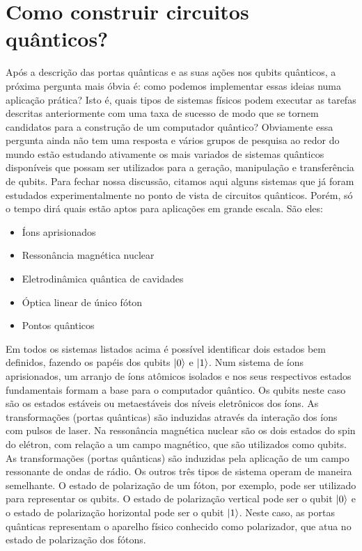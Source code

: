 \documentclass{article}
\begin{document}
\section{Como construir circuitos quânticos?}

Após a descrição das portas quânticas e as suas ações nos qubits quânticos, a próxima pergunta mais óbvia é: como podemos implementar essas ideias numa aplicação prática? Isto é, quais tipos de sistemas físicos podem executar as tarefas descritas anteriormente com uma taxa de sucesso de modo que se tornem candidatos para a construção de um computador quântico? Obviamente essa pergunta ainda não tem uma resposta e vários grupos de pesquisa ao redor do mundo estão estudando ativamente os mais variados de sistemas quânticos disponíveis que possam ser utilizados para a geração, manipulação e transferência de qubits. Para fechar nossa discussão, citamos aqui alguns sistemas que já foram estudados experimentalmente no ponto de vista de circuitos quânticos. Porém, só o tempo dirá quais estão aptos para aplicações em grande escala. São eles:

\begin{itemize}
    \item Íons aprisionados
    \item Ressonância magnética nuclear
    \item Eletrodinâmica quântica de cavidades
    \item Óptica linear de único fóton
    \item Pontos quânticos
\end{itemize}
Em todos os sistemas listados acima é possível identificar dois estados bem definidos, fazendo os papéis dos qubits $\ket{0}$ e $\ket{1}$. Num sistema de íons aprisionados, um arranjo de íons atômicos isolados e nos seus respectivos estados fundamentais formam a base para o computador quântico. Os qubits neste caso são os estados estáveis ou metaestáveis dos níveis eletrônicos dos íons. As transformações (portas quânticas) são induzidas através da interação dos íons com pulsos de laser. Na ressonância magnética nuclear são os dois estados do spin do elétron, com relação a um campo magnético, que são utilizados como qubits. As transformações (portas quânticas) são induzidas pela aplicação de um campo ressonante de ondas de rádio. Os outros três tipos de sistema operam de maneira semelhante. O estado de polarização de um fóton, por exemplo, pode ser utilizado para representar os qubits. O estado de polarização vertical pode ser o qubit $\ket{0}$ e o estado de polarização horizontal pode ser o qubit $\ket{1}$. Neste caso, as portas quânticas representam o aparelho físico conhecido como polarizador, que atua no estado de polarização dos fótons.
\end{document}
